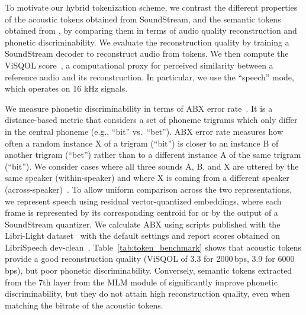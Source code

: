 \documentclass[letterpaper,10 pt]{IEEEtran}
\begin{document}
To motivate our hybrid tokenization scheme, we contrast the different properties of the acoustic tokens obtained from SoundStream, and the semantic tokens obtained from \wvbert, by comparing them in terms of audio quality reconstruction and phonetic discriminability. We evaluate the reconstruction quality by training a SoundStream decoder to reconstruct audio from tokens. We then compute the ViSQOL score~\cite{hines2015visqol, chinen2020visqol}, a computational proxy for perceived similarity between a reference audio and its reconstruction. In particular, we use the ``speech'' mode, which operates on 16 kHz signals.

We measure phonetic discriminability in terms of ABX error rate~\cite{abx}. It is a distance-based metric that considers a set of phoneme trigrams which only differ in the central phoneme (e.g., ``bit'' vs.\ ``bet''). ABX error rate measures how often a random instance X of a trigram (``bit'') is closer to an instance B of another trigram (``bet'') rather than to a different instance A of the same trigram (``bit''). We consider cases where all three sounds A, B, and X are uttered by the same speaker (within-speaker) and where X is coming from a different speaker (across-speaker)~\cite{schatz2016abx}. To allow uniform comparison across the two representations, we represent speech using residual vector-quantized embeddings, where each frame is represented by its corresponding centroid for \wvbert or by the output of a SoundStream quantizer. We calculate ABX  using scripts published with the Libri-Light dataset~\cite{librilight} with the default settings and report scores obtained on LibriSpeech dev-clean~\cite{librispeech}.
Table~\ref{tab:token_benchmark} shows that acoustic tokens provide a good reconstruction quality (ViSQOL of 3.3  for 2000\,bps, 3.9 for 6000\,bps), but poor phonetic discriminability. Conversely, semantic tokens extracted from the 7th layer from the MLM module of \wvbert  significantly improve phonetic discriminability, but they do not attain high reconstruction quality, even when matching the bitrate of the acoustic tokens. 
\end{document}

